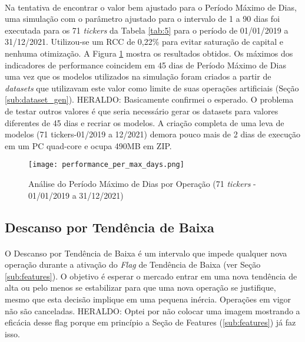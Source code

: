 \paragraph{} Na tentativa de encontrar o valor bem ajustado para o Período Máximo de Dias, uma simulação com o parâmetro ajustado para o intervalo de 1 a 90 dias foi executada para os 71 \textit{tickers} da Tabela \ref{tab:5} para o período de 01/01/2019 a 31/12/2021. Utilizou-se um RCC de 0,22\% para evitar saturação de capital e nenhuma otimização. A Figura \ref{fig:740} mostra os resultados obtidos. Os máximos dos indicadores de performance coincidem em 45 dias de Período Máximo de Dias uma vez que os modelos utilizados na simulação foram criados a partir de \textit{datasets} que utilizavam este valor como limite de suas operações artificiais (Seção \ref{sub:dataset_gen}). \color{red} HERALDO: Basicamente confirmei o esperado. O problema de testar outros valores é que seria necessário gerar os datasets para valores diferentes de 45 dias e recriar os modelos. A criação completa de uma leva de modelos (71 tickers-01/2019 a 12/2021) demora pouco mais de 2 dias de execução em um PC quad-core e ocupa 490MB em ZIP. \color{black}

\begin{figure}[!htb]
    \texttt{[image: performance\_per\_max\_days.png]}
    \centering
    \caption{Análise do Período Máximo de Dias por Operação (71 \textit{tickers} - 01/01/2019 a 31/12/2021)}
    \label{fig:740}
\end{figure}




\FloatBarrier
\subsection{Descanso por Tendência de Baixa}
\label{sub:downtrend_halt}

\paragraph{} O Descanso por Tendência de Baixa é um intervalo que impede qualquer nova operação durante a ativação do \textit{Flag} de Tendência de Baixa (ver Seção \ref{sub:features}). O objetivo é esperar o mercado entrar em uma nova tendência de alta ou pelo menos se estabilizar para que uma nova operação se justifique, mesmo que esta decisão implique em uma pequena inércia. Operações em vigor não são canceladas. \color{red} HERALDO: Optei por não colocar uma imagem mostrando a eficácia desse flag porque em princípio a Seção de Features (\ref{sub:features}) já faz isso. 



